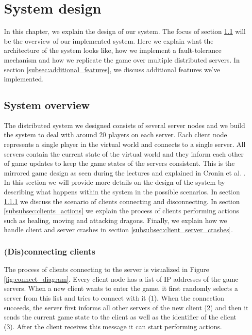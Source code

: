 \section{System design}
\label{sec:design}
In this chapter, we explain the design of our system. The focus of section \ref{subsec:system_overview} will be the overview of our implemented system.
Here we explain what the architecture of the system looks like, how we implement a fault-tolerance mechanism and how we replicate the game over multiple distributed servers. 
In section \ref{subsec:additional_features}, we discuss additional features we've implemented.

\subsection{System overview}
\label{subsec:system_overview}
The distributed system we designed consists of several server nodes and we build the system to deal with around 20 players on each server. 
Each client node represents a single player in the virtual world and connects to a single server.
All servers contain the current state of the virtual world and they inform each other of game updates to keep the game states of the servers consistent. 
This is the mirrored game design as seen during the lectures and explained in Cronin et al. \cite{cronin2002efficient}. 
In this section we will provide more details on the design of the system by describing what happens within the system in the possible scenarios. 
In section \ref{subsubsec:disconnecting_clients} we discuss the scenario of clients connecting and disconnecting. 
In section \ref{subsubsec:clients_actions} we explain the process of clients performing actions such as healing, moving and attacking dragons. 
Finally, we explain how we handle client and server crashes in section \ref{subsubsec:client_server_crashes}.

\subsubsection{(Dis)connecting clients}
\label{subsubsec:disconnecting_clients}
The process of clients connecting to the server is visualized in Figure \ref{fig:connect_diagram}. 
Every client node has a list of IP addresses of the game servers. When a new client wants to enter the game, it first randomly selects a server from this list and tries to connect with it (1). 
When the connection succeeds, the server first informs all other servers of the new client (2) and then it sends the current game state to the client as well as the identifier of the client (3). 
After the client receives this message it can start performing actions.

